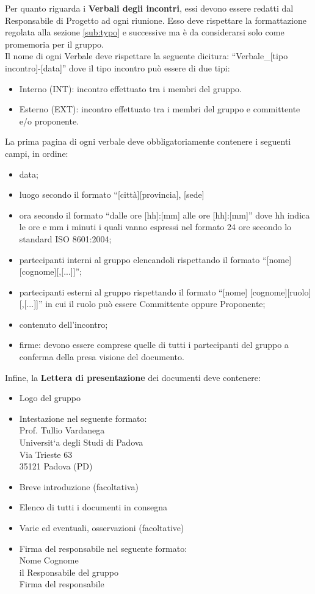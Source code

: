 {{\begin{itemize}
		\end{itemize}
		Per quanto riguarda i \textbf{Verbali degli incontri}, essi devono essere redatti dal Responsabile di Progetto ad ogni riunione. Esso deve rispettare la formattazione regolata alla sezione \ref{sub:typo} e successive ma è da considerarsi solo come promemoria per il gruppo.\\
		Il nome di ogni Verbale deve rispettare la seguente dicitura: “Verbale\_[tipo incontro]-[data]” dove il tipo incontro può essere di due tipi:
		\begin{itemize}
			\item Interno (INT): incontro effettuato tra i membri del gruppo.
			\item Esterno (EXT): incontro effettuato tra i membri del gruppo e committente e/o proponente.
		\end{itemize}
		La prima pagina di ogni verbale deve obbligatoriamente contenere i seguenti campi, in ordine:
		\begin{itemize}
			\item data;
			\item luogo secondo il formato “[città][provincia], [sede]
			\item ora secondo il formato “dalle ore [hh]:[mm] alle ore [hh]:[mm]” dove hh indica le ore e mm i minuti i quali vanno espressi nel formato 24 ore secondo lo standard ISO 8601:2004;
			\item partecipanti interni al gruppo elencandoli rispettando il formato “[nome] [cognome][,[...]]”;
			\item partecipanti esterni al gruppo rispettando il formato “[nome] [cognome][ruolo][,[...]]” in cui il ruolo può essere Committente oppure Proponente;
			\item contenuto dell'incontro;
			\item firme: devono essere comprese quelle di tutti i partecipanti del gruppo \gruppo a conferma della presa visione del documento.
		\end{itemize}
		Infine, la \textbf{Lettera di presentazione} dei documenti deve contenere:
		\begin{itemize}
			\item Logo del gruppo
			\item Intestazione nel seguente formato:\\
					Prof. Tullio Vardanega\\
					Universit`a degli Studi di Padova\\
					Via Trieste 63\\
					35121 Padova (PD)
			\item Breve introduzione (facoltativa)
			\item Elenco di tutti i documenti in consegna
			\item Varie ed eventuali, osservazioni (facoltative)
			\item Firma del responsabile nel seguente formato:\\
					{Nome} {Cognome}\\
					il Responsabile del gruppo \gruppo \\
					{Firma del responsabile}
		\end{itemize}		
	}
}
